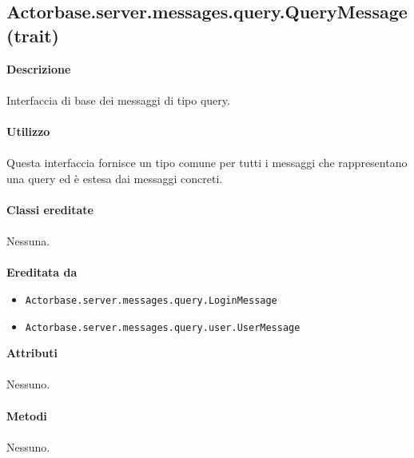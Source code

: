 \documentclass[a4paper]{article}
\begin{document}
	\subsection{Actorbase.server.messages.query.QueryMessage (trait)}
		\textbf{Descrizione}
			\\ \\
			Interfaccia di base dei messaggi di tipo query.
			\\ \\
		\textbf{Utilizzo}
			\\ \\
			Questa interfaccia fornisce un tipo comune per tutti i messaggi che rappresentano una query ed è estesa dai messaggi concreti.
			\\ \\
		\textbf{Classi ereditate}
			\\ \\
			Nessuna.
			\\ \\
		\textbf{Ereditata da}
			\begin{itemize}
				\item \texttt{Actorbase.server.messages.query.LoginMessage }
				\item \texttt{Actorbase.server.messages.query.user.UserMessage }
			\end{itemize}
		\textbf{Attributi}
			\\ \\
			Nessuno.
			\\ \\
		\textbf{Metodi}
			\\ \\
			Nessuno.
			
\end{document}
